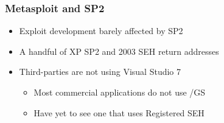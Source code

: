 \documentclass{beamer}
\newenvironment{sitemize}{\vspace{1mm}\begin{itemize}\itemsep 4pt\small}{\end{itemize}}
\begin{document}
\begin{frame}[t]
  \frametitle{Metasploit and SP2}
	\begin{sitemize}
		\item Exploit development barely affected by SP2
		\item A handful of XP SP2 and 2003 SEH return addresses
		\item Third-parties are not using Visual Studio 7
		\begin{sitemize}
			\item Most commercial applications do not use /GS
			\item Have yet to see one that uses Registered SEH
		\end{sitemize}
	\end{sitemize}
\end{frame}
\end{document}
